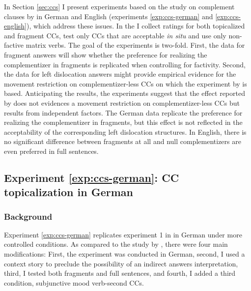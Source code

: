 In Section \ref{sec:ccs} I present experiments based on the study on complement clauses by \citet{merchant.etal2013} in German and English (experiments \ref{exp:ccs-german} and \ref{exp:ccs-english}), which address these issues. In the I collect ratings for both topicalized and fragment CCs, test only CCs that are acceptable \textit{in situ} and use only non-factive matrix verbs. The goal of the experiments is two-fold. First, the data for fragment answers will show whether the preference for realizing the complementizer in fragments is replicated when controlling for factivity. Second, the data for left dislocation answers might provide empirical evidence for the movement restriction on complementizer-less CCs on which the experiment by \citet{merchant.etal2013} is based. Anticipating the results, the experiments suggest that the effect reported by \citet{merchant.etal2013} does not evidences a movement restriction on complementizer-less CCs but results from independent factors. The German data replicate the preference for realizing the complementizer in fragments, but this effect is not reflected in the acceptability of the corresponding left dislocation structures. In English, there is no significant difference between fragments at all and null complementizers are even preferred in full sentences.

\label{exp:ccs-german}
\subsection{Experiment \ref{exp:ccs-german}: CC topicalization in German} 
\label{sec:ccs-german}

\subsubsection{Background}\label{sec:ccs-german-background}
Experiment \ref{exp:ccs-german} replicates experiment 1 in \citet{merchant.etal2013} in German under more controlled conditions. As compared to the study by \citet{merchant.etal2013}, there were four main modifications: First, the experiment was conducted in German, second, I used a context story to preclude the possibility of an indirect answers interpretation, third, I tested both fragments and full sentences, and fourth, I added a third condition, subjunctive mood verb-second CCs.

